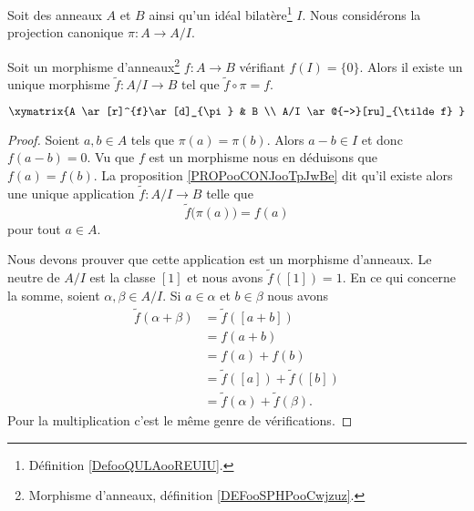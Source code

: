 \begin{proposition}	\label{PROPooPZGFooEbSBXD}
	Soit des anneaux \( A\) et \( B\) ainsi qu'un idéal bilatère\footnote{Définition \ref{DefooQULAooREUIU}.} \( I\). Nous considérons la projection canonique \(\pi \colon A\to A/I  \).

	Soit un morphisme d'anneaux\footnote{Morphisme d'anneaux, définition \ref{DEFooSPHPooCwjzuz}.} \(f \colon A\to B  \) vérifiant \( f(I)=\{ 0 \}\). Alors il existe un unique morphisme \(\tilde f \colon A/I\to B  \) tel que \( \tilde f\circ\pi=f\).

	\begin{equation}
		\xymatrix{%
			A \ar[r]^{f}\ar[d]_{\pi}       &   B                         \\
			A/I    \ar@{-->}[ru]_{\tilde f}
		}
	\end{equation}
\end{proposition}

\begin{proof}
	Soient \( a,b\in A\) tels que \( \pi(a)=\pi(b)\). Alors \( a-b\in I\) et donc \( f(a-b)=0\). Vu que \( f\) est un morphisme nous en déduisons que \( f(a)=f(b)\). La proposition \ref{PROPooCONJooTpJwBe} dit qu'il existe alors une unique application \(\tilde f \colon A/I\to B  \) telle que
	\begin{equation}
		\tilde f\big( \pi(a) \big)=f(a)
	\end{equation}
	pour tout \( a\in A\).

	Nous devons prouver que cette application est un morphisme d'anneaux. Le neutre de \( A/I\) est la classe \( [1]\) et nous avons \( \tilde f([1])=1\). En ce qui concerne la somme, soient \( \alpha,\beta\in A/I\). Si \( a\in \alpha\) et \( b\in \beta\) nous avons
	\begin{subequations}
		\begin{align}
			\tilde f(\alpha+\beta) & =\tilde f([a+b])                   \\
			                       & =f(a+b)                            \\
			                       & =f(a)+f(b)                         \\
			                       & =\tilde f([a])+\tilde f([b])       \\
			                       & =\tilde f(\alpha)+\tilde f(\beta).
		\end{align}
	\end{subequations}
	Pour la multiplication c'est le même genre de vérifications.
\end{proof}

